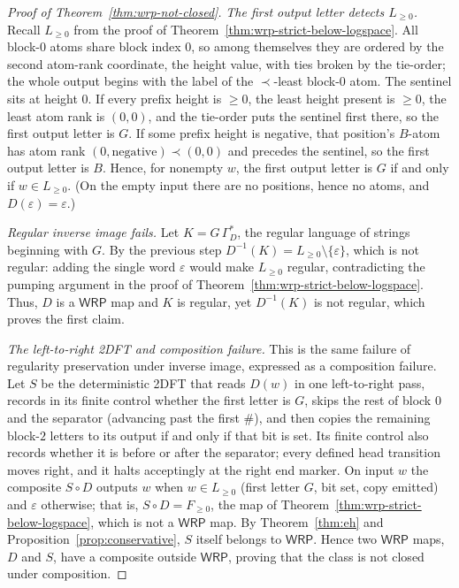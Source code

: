 \documentclass[11pt]{article}
\theoremstyle{definition}
\newcommand{\WRP}{\mathsf{WRP}}
\begin{document}
\begin{proof}[Proof of Theorem~\ref{thm:wrp-not-closed}]
\vspace{0.5em}
\noindent\emph{The first output letter detects $L_{\ge 0}$.}
Recall $L_{\ge 0}$ from the proof of
Theorem~\ref{thm:wrp-strict-below-logspace}.  All block-$0$ atoms share block
index $0$, so among themselves they are ordered by the second atom-rank
coordinate, the height value, with ties broken by the tie-order; the whole output begins
with the label of the $\prec$-least block-$0$ atom.  The sentinel sits at height
$0$.  If every prefix height is $\ge 0$, the least height present is $\ge 0$,
the least atom rank is $(0,0)$, and the tie-order puts the sentinel first there, so
the first output letter is $G$.  If some prefix height is negative, that
position's $B$-atom has atom rank $(0,\text{negative})\prec(0,0)$ and precedes the
sentinel, so the first output letter is $B$.  Hence, for nonempty $w$, the
first output letter is
$G$ if and only if $w\in L_{\ge 0}$.  (On the empty input there are no
positions, hence no atoms, and $D(\varepsilon)=\varepsilon$.)

\vspace{0.5em}
\noindent\emph{Regular inverse image fails.}
Let $K=G\,\Gamma_D^*$, the regular language of strings beginning with $G$.  By the
previous step $D^{-1}(K)=L_{\ge 0}\setminus\{\varepsilon\}$, which is not
regular: adding the single word $\varepsilon$ would make $L_{\ge 0}$ regular,
contradicting the pumping
argument in the proof of Theorem~\ref{thm:wrp-strict-below-logspace}.  Thus, $D$
is a $\WRP$ map and $K$ is regular, yet $D^{-1}(K)$ is not regular,
which proves the first claim.

\vspace{0.5em}
\noindent\emph{The left-to-right 2DFT and composition failure.}
This is the same failure of regularity preservation under inverse image,
expressed as a composition failure.
Let $S$ be the deterministic 2DFT that reads $D(w)$ in one left-to-right pass,
records in its finite control whether the first letter is $G$, skips the rest
of block $0$ and the separator (advancing past the first $\#$), and then copies
the remaining block-$2$ letters to its output if and only if that bit is set.
Its finite control also records whether it is before or after the separator;
every defined head transition moves right, and it halts acceptingly at the
right end marker.  On
input $w$ the composite $S\circ D$ outputs $w$ when $w\in L_{\ge 0}$ (first
letter $G$, bit set, copy emitted) and $\varepsilon$ otherwise; that is,
$S\circ D=F_{\ge 0}$, the map of
Theorem~\ref{thm:wrp-strict-below-logspace}, which is not a $\WRP$
map.  By Theorem~\ref{thm:eh} and
Proposition~\ref{prop:conservative}, $S$ itself belongs to $\WRP$.  Hence two
$\WRP$ maps, $D$ and $S$, have a composite outside $\WRP$, proving that the
class is not closed under composition.
\end{proof}
\end{document}
